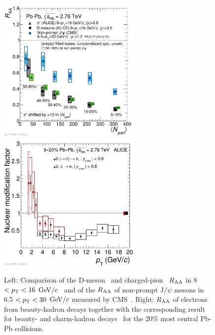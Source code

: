 \begin{figure}[!ht]
  \centering
    \includegraphics[width=7cm]{FigCap2/2017-May-22-RaavsNpart_Dmes8to16_Pions8to16_FinalNonPromptJpsi2017_CC_25042017.pdf}
    \includegraphics[width=7cm]{FigCap2/2017-Jan-28-rParAAbeautyincl.pdf}
  \caption{Left: Comparison of the D-meson~\cite{Adam:2015nna} and charged-pion~\cite{Abelev:2014laa} $R_{\rm AA}$ in 8 $< p_{\rm T} < 16$ $\mathrm{GeV}/c$~\cite{Adam:2015nna} 
and of the $R_{\rm AA}$ of non-prompt J$/\psi$ mesons in 6.5 $< p_{\rm T} < 30$ $\mathrm{GeV}/c$ measured by CMS~\cite{Khachatryan:2016ypw}. 
Right: $R_{\rm AA}$ of electrons from beauty-hadron decays together with
the corresponding result for beauty- and charm-hadron decays~\cite{Adam:2016khe} for the 20\% most central Pb-Pb collisions.}
  \label{fig:ColorMassDep}
\end{figure}

